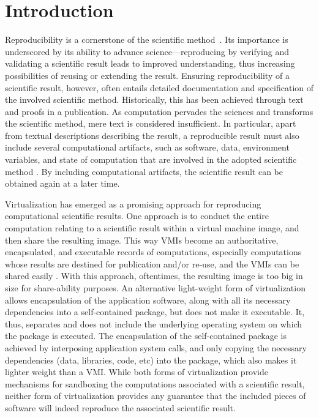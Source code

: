 \section{Introduction}

Reproducibility is a cornerstone of the scientific method~\cite{borgman2012data}. 
Its importance is underscored by its ability to advance science---reproducing by verifying and validating a scientific result leads to improved understanding, thus increasing possibilities of reusing or extending the result. 
Ensuring reproducibility of a scientific result, however, often entails detailed documentation and specification of the involved scientific method. Historically, this has been achieved through text and proofs in a publication. 
As computation pervades the sciences and transforms the scientific method, mere text is considered insufficient. 
In particular, apart from textual descriptions describing the result, a reproducible result must also include several computational artifacts, such as software, data,  environment variables, and state of computation that are involved in the adopted scientific method \cite{Sole}.  By including computational artifacts, the scientific result can be obtained again at a later time. 

Virtualization has emerged as a promising approach for reproducing computational scientific results. One approach is to conduct the entire computation relating to a scientific result within a virtual machine image, and then share the resulting image. This way VMIs become an authoritative, encapsulated, and executable records of computations, especially computations whose results are destined for publication and/or re-use, and the VMIs can be shared easily \cite{Lampoudi}. 
With this approach, oftentimes, the resulting image is too big in size for share-ability purposes. An alternative light-weight form of virtualization allows encapsulation of the application software, along with all its necessary dependencies into a self-contained package, but does not make it executable.  It, thus, separates and does not include the underlying operating system on which the package is executed. The encapsulation of the self-contained package is achieved by interposing application system calls, and only copying the necessary dependencies (data, libraries, code, etc) into the package, which also makes it lighter weight than a VMI. While both forms of virtualization provide mechanisms for sandboxing the computations associated with a scientific result, neither form of virtualization provides any guarantee that the included pieces of software will indeed reproduce the associated scientific result. 

